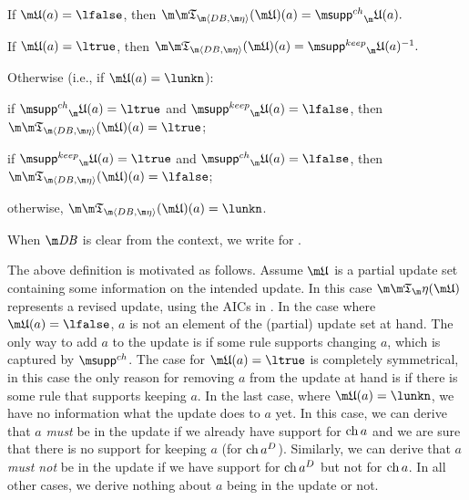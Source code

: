 \begin{definition}
\begin{compactitem}
 \item If $\UUU(a)=\lfalse$, then $\Apfull(\UUU)(a) = \suppin_\UUU(a).$
 \item If $\UUU(a)=\ltrue$, then $\Apfull(\UUU)(a) = \suppout_\UUU(a)^{-1}.$
 \item Otherwise (i.e., if $\UUU(a) = \lunkn$):
  \begin{compactitem}
    \item if $\suppin_\UUU(a) = \ltrue$ and $\suppout_\UUU(a)=\lfalse$, then $\Apfull(\UUU)(a)=\ltrue$;
    \item if $\suppout_\UUU(a) = \ltrue$ and $\suppin_\UUU(a)=\lfalse$, then $\Apfull(\UUU)(a)=\lfalse$;
    \item otherwise, $\Apfull(\UUU)(a)=\lunkn$.
\end{compactitem}

\end{compactitem}
When $\db$ is clear from the context, we write \Ap for \Apfull.
 
\end{definition}

The above definition is motivated as follows. Assume $\UUU$ is a partial update set containing some information on the intended update. In this case $\Ap(\UUU)$ represents a revised update, using the AICs in \aics. 
In the case where $\UUU(a)=\lfalse$, $a$ is not an element of the (partial) update set at hand. The only way to add $a$ to the update is if some rule supports changing $a$, which is captured by $\suppin$. 
The case for $\UUU(a)=\ltrue$ is completely symmetrical, in this case the only reason for removing $a$ from the update at hand is if there is some rule that supports keeping $a$.
In the last case, where $\UUU(a)=\lunkn$, we have no information what the update does to $a$ yet. In this case, we can derive that $a$ \emph{must} be in the update if we already have support for $\operatorname{ch} a$ and we are sure that there is no support for keeping $a$ (for $\operatorname{ch} a^D$). Similarly, we can derive that $a$ \emph{must not} be in the update if we have support for $\operatorname{ch} a^D$ but not for $\operatorname{ch} a$. 
In all other cases, we derive nothing about $a$ being in the update or not. 


